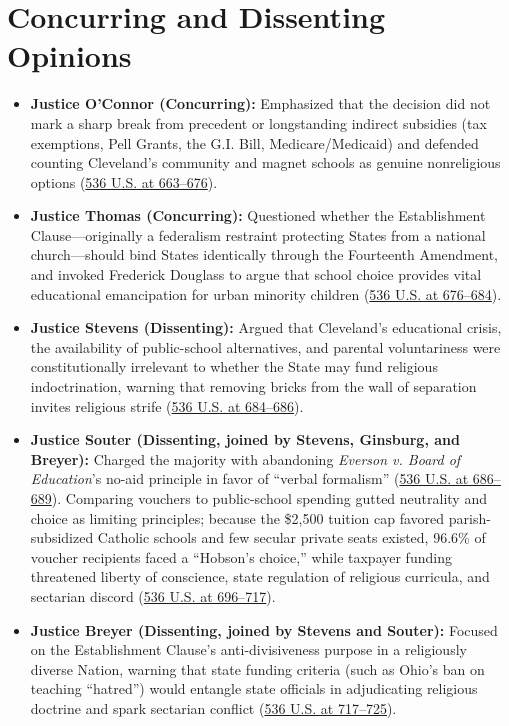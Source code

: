 \documentclass[12pt]{article}
\begin{document}
\section{Concurring and Dissenting Opinions}

\begin{itemize}
  \item \textbf{Justice O'Connor (Concurring):} Emphasized that the decision did not mark a sharp break from precedent or longstanding indirect subsidies (tax exemptions, Pell Grants, the G.I. Bill, Medicare/Medicaid) and defended counting Cleveland's community and magnet schools as genuine nonreligious options (\href{https://supreme.justia.com/cases/federal/us/536/639/}{536 U.S. at 663--676}).
  \item \textbf{Justice Thomas (Concurring):} Questioned whether the Establishment Clause---originally a federalism restraint protecting States from a national church---should bind States identically through the Fourteenth Amendment, and invoked Frederick Douglass to argue that school choice provides vital educational emancipation for urban minority children (\href{https://supreme.justia.com/cases/federal/us/536/639/}{536 U.S. at 676--684}).
  \item \textbf{Justice Stevens (Dissenting):} Argued that Cleveland's educational crisis, the availability of public-school alternatives, and parental voluntariness were constitutionally irrelevant to whether the State may fund religious indoctrination, warning that removing bricks from the wall of separation invites religious strife (\href{https://supreme.justia.com/cases/federal/us/536/639/}{536 U.S. at 684--686}).
  \item \textbf{Justice Souter (Dissenting, joined by Stevens, Ginsburg, and Breyer):} Charged the majority with abandoning \emph{Everson v. Board of Education}'s no-aid principle in favor of ``verbal formalism'' (\href{https://supreme.justia.com/cases/federal/us/536/639/}{536 U.S. at 686--689}). Comparing vouchers to public-school spending gutted neutrality and choice as limiting principles; because the \$2,500 tuition cap favored parish-subsidized Catholic schools and few secular private seats existed, 96.6\% of voucher recipients faced a ``Hobson's choice,'' while taxpayer funding threatened liberty of conscience, state regulation of religious curricula, and sectarian discord (\href{https://supreme.justia.com/cases/federal/us/536/639/}{536 U.S. at 696--717}).
  \item \textbf{Justice Breyer (Dissenting, joined by Stevens and Souter):} Focused on the Establishment Clause's anti-divisiveness purpose in a religiously diverse Nation, warning that state funding criteria (such as Ohio's ban on teaching ``hatred'') would entangle state officials in adjudicating religious doctrine and spark sectarian conflict (\href{https://supreme.justia.com/cases/federal/us/536/639/}{536 U.S. at 717--725}).
\end{itemize}
\end{document}
